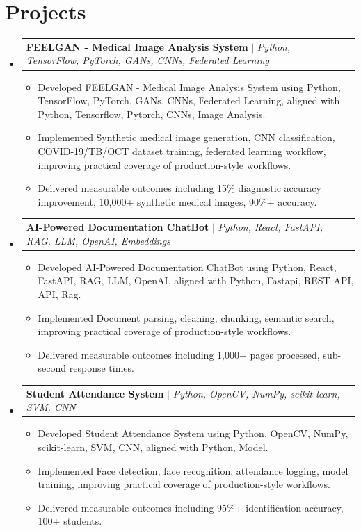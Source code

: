\documentclass[letterpaper,11pt]{article}
\makeatletter
\newcommand{\resumeItem}[1]{
  \item\small{
    {#1 \vspace{1pt}}
  }
}
\newcommand{\resumeProjectHeading}[2]{
    \item
    \begin{tabular*}{1.001\textwidth}{l@{\extracolsep{\fill}}r}
      \small#1 & \textbf{\small #2}\\
    \end{tabular*}\vspace{-4pt}
}
\newcommand{\resumeSubHeadingListStart}{\begin{itemize}[leftmargin=0.0in, label={}, itemsep=2.5pt, parsep=0pt, topsep=1.5pt, partopsep=0pt]}
\newcommand{\resumeSubHeadingListEnd}{\end{itemize}}
\newcommand{\resumeItemListStart}{\begin{itemize}[leftmargin=0.15in, itemsep=1.5pt, parsep=0pt, topsep=1.5pt, partopsep=0pt]}
\newcommand{\resumeItemListEnd}{\end{itemize}\vspace{-2pt}}
\makeatother
\begin{document}
\section{Projects}
    \resumeSubHeadingListStart
    
      \resumeProjectHeading
          {\textbf{FEELGAN - Medical Image Analysis System} $|$ \emph{Python, TensorFlow, PyTorch, GANs, CNNs, Federated Learning}}{}
          \resumeItemListStart
            \resumeItem{Developed FEELGAN - Medical Image Analysis System using Python, TensorFlow, PyTorch, GANs, CNNs, Federated Learning, aligned with Python, Tensorflow, Pytorch, CNNs, Image Analysis.}
            \resumeItem{Implemented Synthetic medical image generation, CNN classification, COVID-19/TB/OCT dataset training, federated learning workflow, improving practical coverage of production-style workflows.}
            \resumeItem{Delivered measurable outcomes including 15\% diagnostic accuracy improvement, 10,000+ synthetic medical images, 90\%+ accuracy.}
          \resumeItemListEnd
          \vspace{-13pt}
          
      \resumeProjectHeading
          {\textbf{AI-Powered Documentation ChatBot} $|$ \emph{Python, React, FastAPI, RAG, LLM, OpenAI, Embeddings}}{}
          \resumeItemListStart
            \resumeItem{Developed AI-Powered Documentation ChatBot using Python, React, FastAPI, RAG, LLM, OpenAI, aligned with Python, Fastapi, REST API, API, Rag.}
            \resumeItem{Implemented Document parsing, cleaning, chunking, semantic search, improving practical coverage of production-style workflows.}
            \resumeItem{Delivered measurable outcomes including 1,000+ pages processed, sub-second response times.}
          \resumeItemListEnd
          \vspace{-13pt}
          
      \resumeProjectHeading
          {\textbf{Student Attendance System} $|$ \emph{Python, OpenCV, NumPy, scikit-learn, SVM, CNN}}{}
          \resumeItemListStart
            \resumeItem{Developed Student Attendance System using Python, OpenCV, NumPy, scikit-learn, SVM, CNN, aligned with Python, Model.}
            \resumeItem{Implemented Face detection, face recognition, attendance logging, model training, improving practical coverage of production-style workflows.}
            \resumeItem{Delivered measurable outcomes including 95\%+ identification accuracy, 100+ students.}
          \resumeItemListEnd
          
    \resumeSubHeadingListEnd
\vspace{-14pt}
\end{document}

